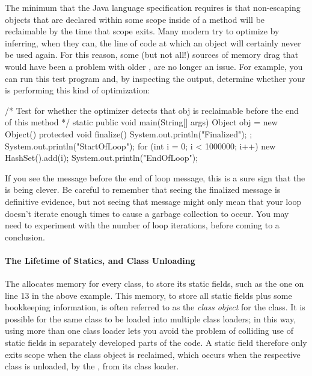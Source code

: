The minimum that the Java language specification requires is that non-escaping
objects that are declared within some scope inside of a method will be
reclaimable by the time that scope exits. Many modern \jres try to optimize by
inferring, when they can, the line of code at which an object will certainly
never be used again. For this reason, some (but not all!) sources of memory
drag that would have been a problem with older \jres, are no longer
an issue. For example, you can run this test program and, by inspecting the
output, determine whether your \jre is performing this kind of optimization:
\begin{shortlisting}
/* Test for whether the optimizer detects that obj is reclaimable before the end of this method */
static public void main(String[] args) {
   Object obj = new Object() {
      protected void finalize() {
         System.out.println("Finalized");
      }
   };
   System.out.println("StartOfLoop");
   for (int i = 0; i < 1000000; i++) {
       new HashSet().add(i);
   }
   System.out.println("EndOfLoop");
}
\end{shortlisting}
If you see the  message before the end of loop message, this is a
sure sign that the \jre is being clever. Be careful to remember that seeing the
finalized message is definitive evidence, but not seeing that message might only
mean that your loop doesn't iterate enough times to cause a garbage collection to
occur. You may need to experiment with the number of loop iterations, before
coming to a conclusion.

\paragraph{The Lifetime of Statics, and Class Unloading}

The \jre allocates memory for every class, to store its static fields, such as
the one on line 13 in the above example. This memory, to store all static fields
plus some bookkeeping information, is often referred to as the \emph{class
object} for the class. It is possible for the same class to
be loaded into multiple class loaders; in this way, using more than one class
loader lets you avoid the problem of colliding use of static fields in separately
developed parts of the code. A static field therefore only exits scope when the
class object is reclaimed, which occurs when the respective class is unloaded, by
the \jre, from its class loader. 

